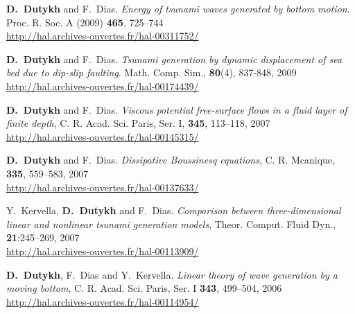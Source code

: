 \begin{etaremune}
  \item \textbf{D.~Dutykh} and F.~Dias. \textit{Energy of tsunami waves generated by bottom motion}. Proc. R. Soc. A (2009) \textbf{465}, 725--744 \\ %
  \url{http://hal.archives-ouvertes.fr/hal-00311752/}
  
  \item \textbf{D.~Dutykh} and F.~Dias. \textit{Tsunami generation by dynamic displacement of sea bed due to dip-slip faulting}. Math. Comp. Sim., \textbf{80}(4), 837-848, 2009 \\ %
  \url{http://hal.archives-ouvertes.fr/hal-00174439/}
  
  

  
  
  \item \textbf{D.~Dutykh} and F.~Dias. \textit{Viscous potential free-surface flows in a fluid layer of finite depth}, C. R. Acad. Sci. Paris, Ser. I, \textbf{345}, 113--118, 2007 \\ %
  \url{http://hal.archives-ouvertes.fr/hal-00145315/}
  
  \item \textbf{D.~Dutykh} and F.~Dias. \textit{Dissipative Boussinesq equations}, C. R. Mcanique, \textbf{335}, 559--583, 2007 \\ %
  \url{http://hal.archives-ouvertes.fr/hal-00137633/}
  
  \item  Y.~Kervella, \textbf{D.~Dutykh} and F.~Dias. \textit{Comparison between three-dimensional linear and nonlinear tsunami generation models}, Theor. Comput. Fluid Dyn., \textbf{21}:245--269, 2007 \\ %
  \url{http://hal.archives-ouvertes.fr/hal-00113909/}
  
  
  
  \item \textbf{D.~Dutykh}, F.~Dias and Y.~Kervella. \textit{Linear theory of wave generation by a moving bottom}, C. R. Acad. Sci. Paris, Ser. I \textbf{343}, 499--504, 2006 \\ %
  \url{http://hal.archives-ouvertes.fr/hal-00114954/}
 
\end{etaremune}

